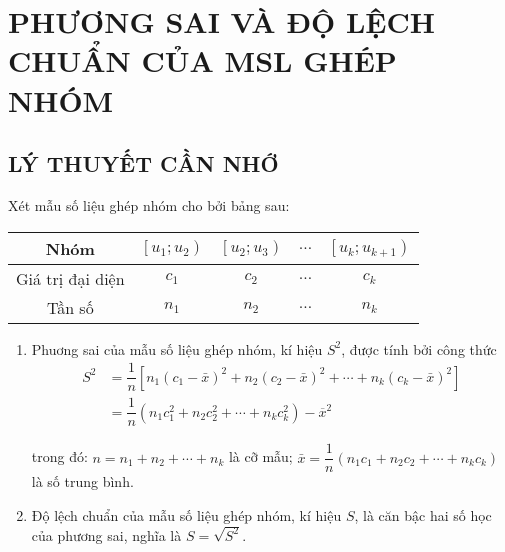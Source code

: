 \setcounter{section}{1}
\setcounter{dang}{0}
\section{PHƯƠNG SAI VÀ ĐỘ LỆCH CHUẨN CỦA MSL GHÉP NHÓM}
\subsection{LÝ THUYẾT CẦN NHỚ}
Xét mẫu số liệu ghép nhóm cho bởi bảng sau:
\begin{center}
	\begin{tabular}{|c|c|c|c|c|}
		\hline Nhóm             & {$\left[u_1; u_2\right)$} & {$\left[u_2; u_3\right)$} & $\ldots$ & {$\left[u_k; u_{k+1}\right)$} \\
		\hline Giá trị đại diện & $c_1$                     & $c_2$                     & $\ldots$ & $c_k$                         \\
		\hline Tần số           & $n_1$                     & $n_2$                     & $\ldots$ & $n_k$                         \\
		\hline
	\end{tabular}
\end{center}
\begin{enumerate}[\iconMT]
	\item {} Phuơng sai của mẫu số liệu ghép nhóm, kí hiệu $S^2$, được tính bởi công thức
	      \begin{align*}
			S^2&=\dfrac{1}{n}\left[n_1\left(c_1-\bar{x}\right)^2+n_2\left(c_2-\bar{x}\right)^2+\cdots+n_k\left(c_k-\bar{x}\right)^2\right]\\
		  &=\dfrac{1}{n}\left(n_1 c_1^2+n_2 c_2^2+\cdots+n_k c_k^2\right)-\overline{x}^2
		  \end{align*}
		  
	      trong đó: $n=n_1+n_2+\cdots+n_k$ là cỡ mẫu; $\bar{x}=\dfrac{1}{n}\left(n_1 c_1+n_2 c_2+\cdots+n_k c_k\right)$ là số trung bình.
	\item {} Độ lệch chuẩn của mẫu số liệu ghép nhóm, kí hiệu $S$, là căn bậc hai số học của phương sai, nghĩa là $S=\sqrt{S^2}$.
\end{enumerate}

